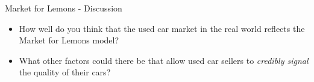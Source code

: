 
\begin{frame}{Market for Lemons - Discussion}
  \begin{itemize}
  \item How well do you think that the used car market in the real world  
  reflects the Market for Lemons model?
  \item What other factors could there be that allow used car sellers 
  to \textit{credibly signal} the quality of their cars?
  \end{itemize}
\end{frame}
